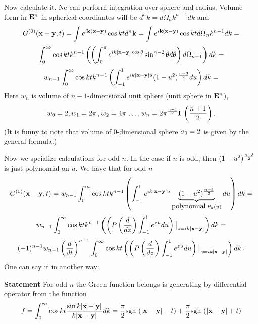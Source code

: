 Now calculate it.  Ne can perform integration over sphere and radius.
Volume form in ${\bf E}^n$ in spherical coordiantes will be
$d^nk= d\Omega_{n}k^{n-1}dk$ and
  $$
   G^{(0)}({\bf x}-{\bf y},t)=
    \int e^{i{\bf k} ({\bf x}-{\bf y})}\cos kt d^n{\bf k}= 
    \int e^{i{\bf k} ({\bf x}-{\bf y})}\cos kt d\Omega_{n}k^{n-1}dk=
                $$
                $$ 
    \int_0^\infty\cos kt k^{n-1}
                     \left(
                      \left(
            \int_0^\pi e^{ik |{\bf x}-{\bf y}|\cos\theta}
                \sin^{n-2}\theta d\theta 
                  \right)
                 d\Omega_{n-1}
                  \right)
          dk= 
     $$
            $$ 
    w_{n-1}\int_0^\infty\cos kt k^{n-1}
                     \left(
            \int_{-1}^1 e^{ik |{\bf x}-{\bf y}|u}
                   (1-u^2)^{n-3\over 2}du 
                  \right)
          dk= 
     $$
Here $w_n$ is volume of $n-1$-dimensional unit sphere
  (unit sphere in ${\bf E}^n$),
            $$
 w_0=2,w_1=2\pi\,,w_2=4\pi\,\dots,  
w_n={2\pi^{n+1\over 2}\Gamma\left(n+1\over 2\right)}\,.
                $$
(It is funny to note that volume of $0$-dimensional sphere ${\sigma}_0=2$ 
is given by the general formula.)


Now we spcialize calculations for odd $n$. In the case if $n$ is odd, then
   $(1-u^2)^{n-3\over 2}$ is just polynomial on $u$. We have
that for odd $n$
          $$
G^{(0)}({\bf x}-{\bf y},t)=  
              w_{n-1}\int_0^\infty\cos kt k^{n-1}
                     \left(
            \int_{-1}^1 e^{ik |{\bf x}-{\bf y}|u}
                            \underbrace
                            {
                   (1-u^2)^{n-3\over 2}
                          }_{\hbox{polynomial}\, P_n(u)}
                       du 
                  \right)
          dk=
          $$
              $$
          w_{n-1}\int_0^\infty\cos kt k^{n-1}
                                   \left(
                     \left(
                                   P\left({d\over dz}\right)
            \int_{-1}^1 e^{zu}
                       du 
                  \right)\big\vert_{z=ik|{\bf x}-{\bf y}|}
                      \right)
          dk=
               $$  
                     $$
          (-1)^{n-1}w_{n-1}\left({d\over dt}\right)^{n-1}
                     \int_0^\infty\cos kt 
                                   \left(
                     \left(
                                   P\left({d\over dz}\right)
            \int_{-1}^1 e^{zu}
                       du 
                  \right)\big\vert_{z=ik|{\bf x}-{\bf y}|}
                      \right)
          dk\,.
               $$
One can say it in another way:

{\bf Statement} For odd $n$ the Green function belongs is generating by 
differential operator from the function
                $$
f=        \int_0^\infty\cos kt 
           {\sin k|{\bf x}-{\bf y}|\over k|{\bf x}-{\bf y}|}
          dk=
 {\pi\over 2}{\rm sgn\,}\left(|{\bf x}-{\bf y}|-t\right)+
 {\pi\over 2}{\rm sgn\,}\left(|{\bf x}-{\bf y}|+t\right)
                $$ 



